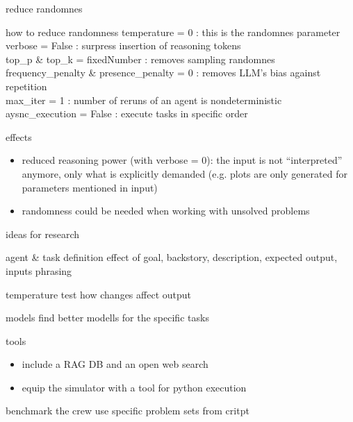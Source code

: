 \documentclass[t]{beamer}
\numberwithin{equation}{section}
\begin{document}
	\begin{frame}[c]{reduce randomnes}
		\begin{block}{how to reduce randomness}
			temperature = 0 : this is the randomnes parameter\\
			verbose = False : surpress insertion of reasoning tokens\\
			top\_p \& top\_k = fixedNumber : removes sampling randomnes\\
			frequency\_penalty \& presence\_penalty  = 0 : removes LLM's bias against repetition\\
			max\_iter = 1 : number of reruns of an agent is nondeterministic\\
			aysnc\_execution = False : execute tasks in specific order
		\end{block}\pause
		
		\begin{alertblock}{effects}
			\begin{itemize}
				\item reduced reasoning power (with verbose = 0): the input is not \enquote{interpreted} anymore, only what is explicitly demanded (e.g. plots are only generated for parameters mentioned in input)
				\item randomness could be needed when working with unsolved problems
			\end{itemize}
		\end{alertblock}
	\end{frame}
	
	\begin{frame}[c]{ideas for research}
		\begin{block}{agent \& task definition}
			effect of goal, backstory, description, expected output, inputs phrasing
		\end{block}
		\pause
		\begin{block}{temperature}
			test how changes affect output
		\end{block}
		\pause
		\begin{block}{models}
			find better modells for the specific tasks
		\end{block}
		\pause
		\begin{alertblock}{tools}
			\begin{itemize}
				\item include a RAG DB and an open web search
				\item equip the simulator with a tool for python execution
			\end{itemize}
		\end{alertblock}
		 \pause
		\begin{exampleblock}{benchmark the crew}
			use specific problem sets\autocite{critptGit} from critpt\autocite{critPtArx}
		\end{exampleblock}
	\end{frame}
	
\end{document}
